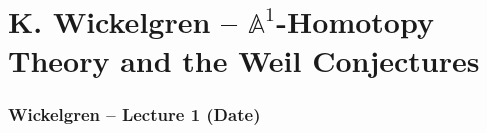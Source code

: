 \part{K. Wickelgren -- $\mathbb{A}^{1}$-Homotopy Theory and the Weil Conjectures}
\section{Wickelgren -- Lecture 1 (Date)}